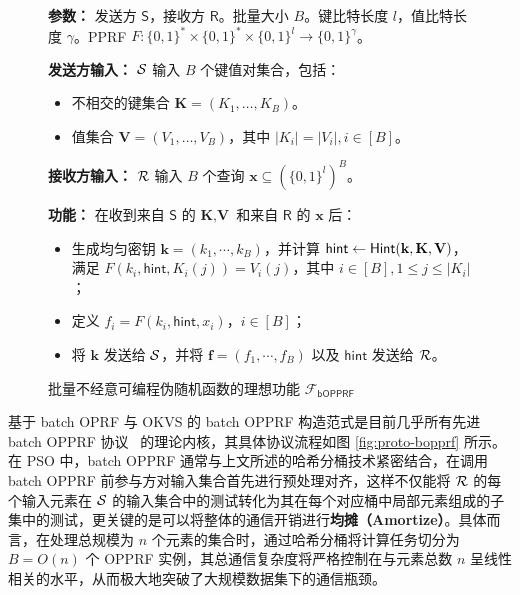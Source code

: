 \begin{figure}[!htb]
\begin{framed}
\begin{minipage}[c]{\textwidth}
\begin{trivlist}
\item \textbf{参数：} 发送方 $\mathsf{S}$，接收方 $\mathsf{R}$。批量大小 $B$。键比特长度 $l$，值比特长度 $\gamma$。PPRF $F: \{0,1\}^* \times \{0,1\}^* \times \{0,1\}^l \to \{0,1\}^{\gamma}$。
\item \textbf{发送方输入：} $\mathcal{S}$ 输入 $B$ 个键值对集合，包括：
\begin{itemize}[itemsep=2pt,topsep=0pt,parsep=0pt,leftmargin=10pt]
\item 不相交的键集合 $\textbf{K} = (K_1, \dots, K_B)$。
\item 值集合 $\textbf{V} = (V_1, \dots, V_B)$，其中 $\lvert K_i \rvert = \lvert V_i \rvert, i \in [B]$。
\end{itemize}
\item \textbf{接收方输入：} $\mathcal{R}$ 输入 $B$ 个查询 $\textbf{x} \subseteq (\{0,1\}^l)^B$。
\item \textbf{功能：} 在收到来自 $\mathsf{S}$ 的 $\textbf{K}, \textbf{V}$ 和来自 $\mathsf{R}$ 的 $\textbf{x}$ 后：
\begin{itemize}[itemsep=2pt,topsep=0pt,parsep=0pt,leftmargin=10pt]
\item 生成均匀密钥 $\textbf{k} = (k_1, \cdots, k_B)$，并计算 {$\mathsf{hint} \gets \mathsf{Hint}(\textbf{k}, \textbf{K}, \textbf{V})$}，满足 $F(k_i, {\mathsf{hint}}, K_i(j)) = V_i(j)$，其中 $i \in [B], 1 \le j \le \lvert K_i \rvert$；
\item 定义 $f_i = F(k_i, {\mathsf{hint}}, x_i)$，$i \in [B]$；
\item 将 $\textbf{k}$ 发送给 $\mathcal{S}$，并将 $\textbf{f} = (f_1, \cdots, f_B)$ 以及 {$\mathsf{hint}$} 发送给 $\mathcal{R}$。
\end{itemize}
\end{trivlist}
\end{minipage}
\end{framed}
\caption{批量不经意可编程伪随机函数的理想功能 $\mathcal{F}_{\mathsf{bOPPRF}}$}\label{fig:func-bopprf}
\end{figure}

基于 batch OPRF 与 OKVS 的 batch OPPRF 构造范式是目前几乎所有先进 batch OPPRF 协议~\cite{PSTY-EUROCRYPT-2019,CGS22,RS-EUROCRYPT-2021,RR-CCS-2022} 的理论内核，其具体协议流程如图 \ref{fig:proto-bopprf} 所示。在 PSO 中，batch OPPRF 通常与上文所述的哈希分桶技术紧密结合，在调用 batch OPPRF 前参与方对输入集合首先进行预处理对齐，这样不仅能将 $\mathcal{R}$ 的每个输入元素在 $\mathcal{S}$ 的输入集合中的测试转化为其在每个对应桶中局部元素组成的子集中的测试，更关键的是可以将整体的通信开销进行\textbf{均摊（Amortize）}。具体而言，在处理总规模为 $n$ 个元素的集合时，通过哈希分桶将计算任务切分为 $B = O(n)$ 个 OPPRF 实例，其总通信复杂度将严格控制在与元素总数 $n$ 呈线性相关的水平，从而极大地突破了大规模数据集下的通信瓶颈。

